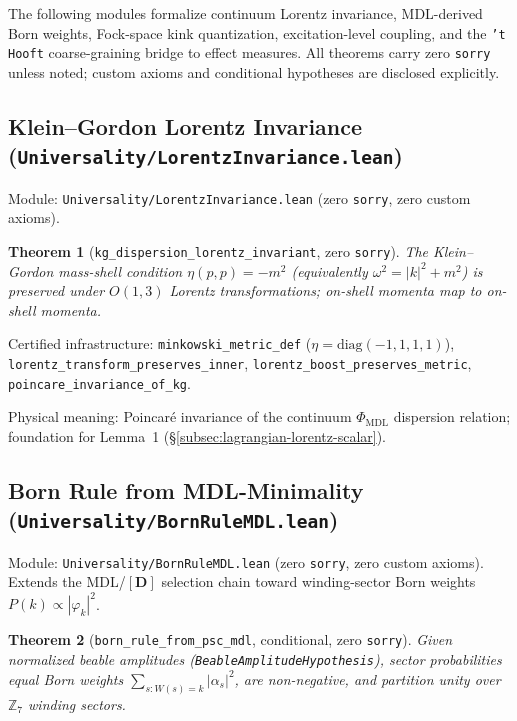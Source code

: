 \documentclass[11pt,a4paper]{article}
\newtheorem{theorem}{Theorem}[section]
\theoremstyle{definition}
\begin{document}
The following modules formalize continuum Lorentz invariance, MDL-derived Born
weights, Fock-space kink quantization, excitation-level coupling, and the
\texttt{'t Hooft} coarse-graining bridge to effect measures.  All theorems carry
zero \texttt{sorry} unless noted; custom axioms and conditional hypotheses are
disclosed explicitly.

\subsection{Klein--Gordon Lorentz Invariance\linebreak
  (\texttt{\small Universality/LorentzInvariance.lean})}\label{subsec:lorentz-invariance}

Module: \texttt{Universality/LorentzInvariance.lean} (zero
\lstinline|sorry|, zero custom axioms).

\begin{theorem}[\lstinline|kg_dispersion_lorentz_invariant|, zero \texttt{sorry}]
The Klein--Gordon mass-shell condition $\eta(p,p)=-m^2$ (equivalently
$\omega^2 = |k|^2 + m^2$) is preserved under $O(1,3)$ Lorentz transformations;
on-shell momenta map to on-shell momenta.
\end{theorem}

Certified infrastructure: \lstinline|minkowski_metric_def| ($\eta=\mathrm{diag}(-1,1,1,1)$),
\lstinline|lorentz_transform_preserves_inner|, \lstinline|lorentz_boost_preserves_metric|,
\lstinline|poincare_invariance_of_kg|.

Physical meaning: Poincar\'e invariance of the continuum $\Phi_{\mathrm{MDL}}$
dispersion relation; foundation for Lemma~1
(\S\ref{subsec:lagrangian-lorentz-scalar}).

\subsection{Born Rule from MDL-Minimality
  (\texttt{Universality/BornRuleMDL.lean})}\label{subsec:born-rule-mdl}

Module: \texttt{Universality/BornRuleMDL.lean} (zero
\lstinline|sorry|, zero custom axioms).
Extends the MDL/$[\mathbf{D}]$ selection chain toward winding-sector Born
weights $P(k) \propto |\varphi_k|^2$.

\begin{theorem}[\lstinline|born_rule_from_psc_mdl|, conditional, zero \texttt{sorry}]
Given normalized beable amplitudes (\lstinline|BeableAmplitudeHypothesis|),
sector probabilities equal Born weights
$\sum_{s: W(s)=k}|\alpha_s|^2$, are non-negative, and partition unity over
$\mathbb{Z}_7$ winding sectors.
\end{theorem}
\end{document}
